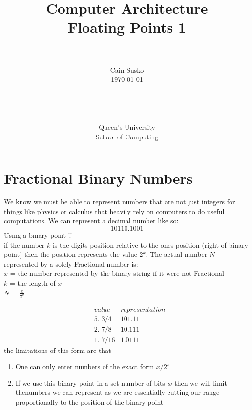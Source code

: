 \documentclass[12pt]{book}
\newcommand{\classID}{Floating Points 1}
\newcommand{\coursename}{Computer Architecture}
\begin{document}
\date{}
\setlength{\parindent}{0em}  %

\title{\coursename\\\classID}

\author{\\ \\ Cain Susko\\\today \\ \\ \\ \\ \\
        Queen's University \\School of Computing} 
 

\maketitle
\pagebreak

  

\section*{Fractional Binary Numbers}
We know we must be able to represent numbers that are not just integers for things like physics or calculus
        that heavily rely on computers to do useful computations.
We can represent a decimal number like so:
\[10110.1001\]
Using a binary point '.'\\
if the number $k$ is the digits position relative to the ones position (right of binary point) then the position
        represents the value $2^k$.
The actual number $N$ represented by a solely Fractional number is:
\\

$x$ = the number represented by the binary string if it were not  Fractional\\
$k$ = the length of  $x$\\
$N$ =  $\frac{x}{2^k}$

\begin{align*}
        &value  &representation\\
        &5.\;{3}/{4}   &101.11\\
        &2.\;{7}/{8}   &10.111\\
        &1.\;{7}/{16}  &1.0111
\end{align*}
the limitations of this form are that 
\begin{enumerate}
        \item One can only enter numbers of the exact form $x/2^k$
        \item If we use this binary point in a set number of bits $w$
                then we will limit thenumbers we can represent as we are 
                essentially cutting our range proportionally to the position
                of the binary point
\end{enumerate}
\end{document}
